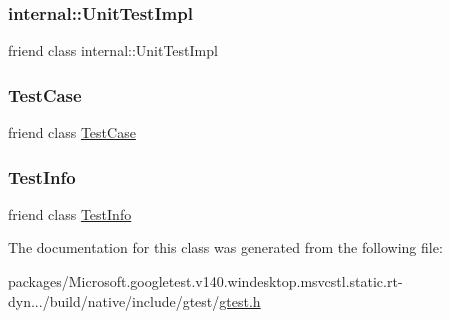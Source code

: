 \subsubsection{\texorpdfstring{internal::UnitTestImpl}{internal::UnitTestImpl}}
{\footnotesize\ttfamily friend class internal\+::\+Unit\+Test\+Impl\hspace{0.3cm}{\ttfamily [friend]}}

\mbox{\label{classtesting_1_1_test_event_listeners_aff779e55b06adfa7c0088bd10253f0f0}} 
\subsubsection{\texorpdfstring{TestCase}{TestCase}}
{\footnotesize\ttfamily friend class \mbox{\hyperlink{classtesting_1_1_test_case}{Test\+Case}}\hspace{0.3cm}{\ttfamily [friend]}}

\mbox{\label{classtesting_1_1_test_event_listeners_a4c49c2cdb6c328e6b709b4542f23de3c}} 
\subsubsection{\texorpdfstring{TestInfo}{TestInfo}}
{\footnotesize\ttfamily friend class \mbox{\hyperlink{classtesting_1_1_test_info}{Test\+Info}}\hspace{0.3cm}{\ttfamily [friend]}}



The documentation for this class was generated from the following file\+:\begin{DoxyCompactItemize}
\item 
packages/\+Microsoft.\+googletest.\+v140.\+windesktop.\+msvcstl.\+static.\+rt-\/dyn.../build/native/include/gtest/\mbox{\hyperlink{gtest_8h}{gtest.\+h}}\end{DoxyCompactItemize}
